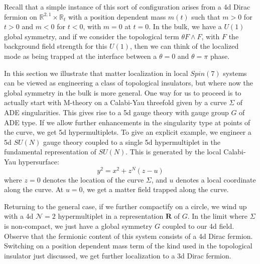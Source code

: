 \documentclass[12pt]{article}%
\numberwithin{equation}{section}
\renewcommand{\(}{\left(}
\renewcommand{\)}{\right)}
\renewcommand{\[}{\left[}
\renewcommand{\]}{\right]}
\begin{document}
Recall that a simple instance of this sort of configuration arises from a 4d Dirac fermion on $\mathbb{R}^{2,1} \times \mathbb{R}_{t}$ with a position dependent mass $m(t)$ such that $m >0$ for $t >0$ and $m <0$ for $t< 0$, with $m = 0$ at $t = 0$. In the bulk, we have a $U(1)$ global symmetry, and if we consider the topological term $\theta F \wedge F$, with $F$ the background field strength for this $U(1)$, then we can think of the localized mode as being trapped at the interface between a $\theta = 0$ and $\theta = \pi$ phase.

In this section we illustrate that matter localization in local $Spin(7)$ systems
can be viewed as engineering a class of topological insulators, but where now
the global symmetry in the bulk is more general. One way for us to proceed is to actually start with M-theory on a Calabi-Yau threefold given by a curve $\Sigma$ of ADE singularities. This gives rise to a 5d gauge theory with gauge group $G$ of ADE type. If we allow further enhancements in the singularity type at points of the curve, we get 5d hypermultiplets. To give an explicit example, we engineer a 5d $SU(N)$ gauge theory coupled to a single 5d hypermultiplet in the fundamental representation of $SU(N)$. This is generated by the local Calabi-Yau hypersurface:
\begin{equation}
y^2 = x^2 + z^N (z - u)
\end{equation}
where $z = 0$ denotes the location of the curve $\Sigma$, and $u$ denotes a local coordinate along the curve. At $u = 0$, we get a matter field trapped along the curve.

Returning to the general case, if we further compactify on a circle, we wind up with a 4d $\mathcal{N} = 2$ hypermultiplet in a representation $\mathbf{R}$ of $G$. In the limit where $\Sigma$ is non-compact, we just have a global symmetry $G$ coupled to our 4d field. Observe that the fermionic content of this system consists of a 4d Dirac fermion. Switching on a position dependent mass term of the kind used in the topological insulator just discussed, we get further localization to a 3d Dirac fermion.
\end{document}
